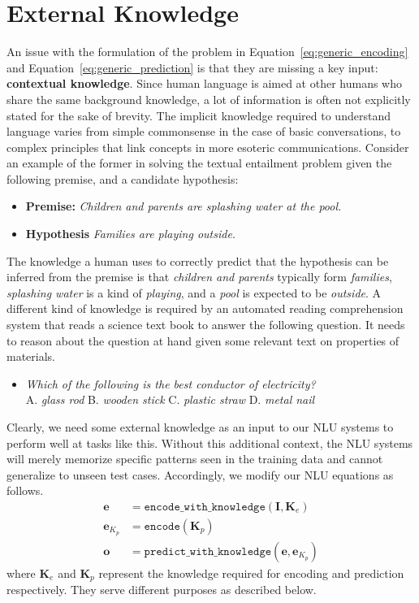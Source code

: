 \section{External Knowledge}
\label{sec:intro_external_knowledge}
An issue with the formulation of the problem in Equation~\ref{eq:generic_encoding} and Equation~\ref{eq:generic_prediction} is that they are missing a key input: \textbf{contextual knowledge}. 
Since human language is aimed at other humans who share 
the same background knowledge, a lot of information is often not explicitly stated
for the sake of brevity. The implicit knowledge required to understand language varies 
from simple commonsense in the case of basic conversations, to complex principles that link 
concepts in more esoteric communications. Consider an example of the former in solving the 
textual entailment problem given the following premise, and a candidate hypothesis:
\begin{itemize}
 \item \textbf{Premise:} \textit{Children and parents are splashing water at the pool.}
 \item \textbf{Hypothesis} \textit{Families are playing outside.}
\end{itemize}
The knowledge a human uses to correctly predict that the hypothesis can be inferred from the 
premise is that \textit{children and parents} typically form \textit{families}, \textit{splashing water} 
is a kind of \textit{playing}, and a \textit{pool} is expected to be \textit{outside}. A different kind of knowledge 
is required by an  automated reading comprehension system that reads a science text book to answer the following 
question. It needs to reason about the question at hand given some relevant text on properties of materials.
\begin{itemize}
 \item \textit{Which of the following is the best conductor of electricity?}\\ 
  A. \textit{glass rod}  B. \textit{wooden stick}  C. \textit{plastic straw} D. \textit{metal nail}
\end{itemize}

Clearly, we need some external knowledge as an input to our NLU systems to perform well at tasks like this.
Without this additional context, the NLU systems will merely memorize specific patterns seen in the training data
and cannot generalize to unseen test cases. Accordingly, we modify our NLU equations as follows.
\begin{align}
 \mathbf{e} &= \mathtt{encode\_with\_knowledge}(\mathbf{I}, \mathbf{K}_e) \label{eq:encoding_with_knowledge}\\
 \mathbf{e}_{K_p} &= \mathtt{encode}(\mathbf{K}_p) \\ \label{eq:knowledge_encoding}
 \mathbf{o} &= \mathtt{predict\_with\_knowledge}(\mathbf{e}, \mathbf{e}_{K_p}) \label{eq:prediction_with_knowledge}
\end{align}
where $\mathbf{K}_e$ and $\mathbf{K}_p$ represent the knowledge required for encoding and prediction respectively. 
They serve different purposes as described below.

